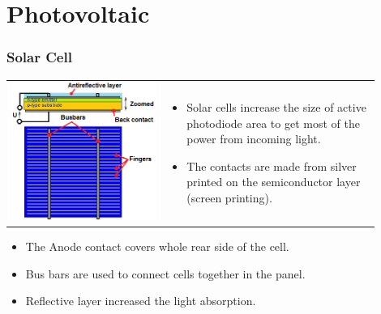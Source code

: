 \documentclass{beamer}
\begin{document}
\section{\texorpdfstring{Photovoltaic}{Photovoltaic}}
	\begin{frame}
    \frametitle{Solar Cell}
		\begin{tabular}{m{0.38\linewidth} m{0.52\linewidth}}
		\includegraphics[scale=0.4]{obr06_konstrukce.png} &
		\small
		\begin{itemize}
			\item Solar cells increase the size of active photodiode area to get most of the power from incoming light.
			\item The contacts are made from silver printed on the semiconductor layer (screen printing).
		\end{itemize}
		\end{tabular}
		
		\begin{itemize}
			\item The Anode contact covers whole rear side of the cell.
			\item Bus bars are used to connect cells together in the panel.
			\item Reflective layer increased the light absorption.
		\end{itemize}
	\end{frame}
\end{document}
